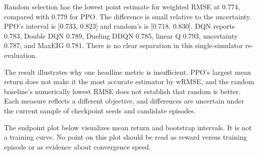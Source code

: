 \documentclass{ieeeaccess}
\begin{document}
Random selection has the lowest point estimate for weighted RMSE at 0.774, compared with 0.779 for PPO. The difference is small relative to the uncertainty. PPO's interval is [0.733, 0.823] and random's is [0.718, 0.830]. DQN reports 0.783, Double DQN 0.789, Dueling DDQN 0.785, linear Q 0.793, uncertainty 0.787, and MaxEIG 0.781. There is no clear separation in this single-simulator re-evaluation.

The result illustrates why one headline metric is insufficient. PPO's largest mean return does not make it the most accurate estimator by wRMSE, and the random baseline's numerically lowest RMSE does not establish that random is better. Each measure reflects a different objective, and differences are uncertain under the current sample of checkpoint seeds and candidate episodes.

The endpoint plot below visualizes mean return and bootstrap intervals. It is not a training curve. No point on this plot should be read as reward versus training episode or as evidence about convergence speed.

\begin{table}[t]\centering\small

\caption{Table 8. Primary benchmark results: mean [95\% interval]}


\end{table}
\end{document}
